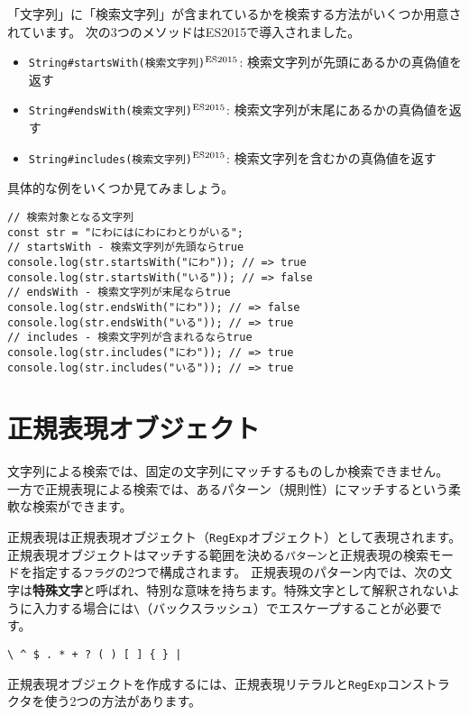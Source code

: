 「文字列」に「検索文字列」が含まれているかを検索する方法がいくつか用意されています。
次の3つのメソッドはES2015で導入されました。

\begin{itemize}
\item
  \texttt{String\#startsWith(検索文字列)}{$^{\rm ES2015}$}:
  検索文字列が先頭にあるかの真偽値を返す
\item
  \texttt{String\#endsWith(検索文字列)}{$^{\rm ES2015}$}:
  検索文字列が末尾にあるかの真偽値を返す
\item
  \texttt{String\#includes(検索文字列)}{$^{\rm ES2015}$}:
  検索文字列を含むかの真偽値を返す
\end{itemize}

具体的な例をいくつか見てみましょう。

\begin{lstlisting}
// 検索対象となる文字列
const str = "にわにはにわにわとりがいる";
// startsWith - 検索文字列が先頭ならtrue
console.log(str.startsWith("にわ")); // => true
console.log(str.startsWith("いる")); // => false
// endsWith - 検索文字列が末尾ならtrue
console.log(str.endsWith("にわ")); // => false
console.log(str.endsWith("いる")); // => true
// includes - 検索文字列が含まれるならtrue
console.log(str.includes("にわ")); // => true
console.log(str.includes("いる")); // => true
\end{lstlisting}

\hypertarget{regexp-object}{%
\section{正規表現オブジェクト}\label{regexp-object}}

文字列による検索では、固定の文字列にマッチするものしか検索できません。
一方で正規表現による検索では、あるパターン（規則性）にマッチするという柔軟な検索ができます。

正規表現は正規表現オブジェクト（\texttt{RegExp}オブジェクト）として表現されます。
正規表現オブジェクトはマッチする範囲を決める\texttt{パターン}と正規表現の検索モードを指定する\texttt{フラグ}の2つで構成されます。
正規表現のパターン内では、次の文字は\textbf{特殊文字}と呼ばれ、特別な意味を持ちます。特殊文字として解釈されないように入力する場合には\texttt{\textbackslash}（バックスラッシュ）でエスケープすることが必要です。

\begin{lstlisting}
\ ^ $ . * + ? ( ) [ ] { } |
\end{lstlisting}

正規表現オブジェクトを作成するには、正規表現リテラルと\texttt{RegExp}コンストラクタを使う2つの方法があります。

